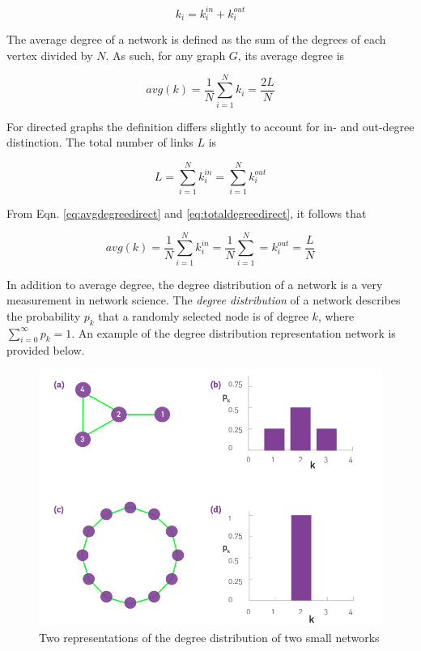 \documentclass{article}
\begin{document}
\begin{equation}
k_i = k_i^{in} + k_i^{out}
\end{equation}

The average degree of a network is defined as the sum of the degrees of each vertex divided by $N$. As such, for any graph $G$, its average degree is

\begin{equation}\label{eq:avgdegreedirect}
avg(k) = \frac{1}{N} \sum_{i=1}^N k_i = \frac{2L}{N}
\end{equation}

For directed graphs the definition differs slightly to account for in- and out-degree distinction.  The total number of links $L$ is 

\begin{equation}\label{eq:totaldegreedirect}
L = \sum_{i=1}^N k_i^{in} = \sum_{i=1}^N k_i^{out}
\end{equation}


From Eqn. \ref{eq:avgdegreedirect} and \ref{eq:totaldegreedirect}, it follows that

\begin{equation}
avg(k) = \frac{1}{N} \sum_{i=1}^N k_i^{in} = \frac{1}{N}\sum_{i=1}^N =  k_i^{out} = \frac{L}{N}
\end{equation}



In addition to average degree, the degree distribution of a network is a very measurement in network science.  The \textit{degree distribution} of a network describes the probability $p_k$ that a randomly selected node is of degree $k$, where $\sum_{i=0}^{\infty} p_k = 1$.  An example of the degree distribution representation network is provided below.



\begin{figure}[h]
    \center
    \includegraphics[scale=0.45]{ns-degdistribution}
    \caption{Two representations of the degree distribution of two small networks  \cite{ns}}
    \label{fig:degdistribution}
\end{figure}
\end{document}
